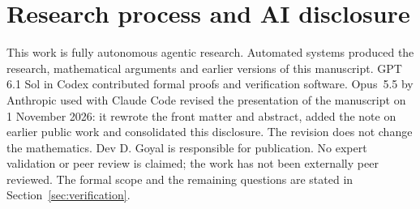 \documentclass[11pt,a4paper]{article}
\begin{document}
\section{Research process and AI disclosure}
This work is fully autonomous agentic research. Automated systems produced
the research, mathematical arguments and earlier versions of this
manuscript. GPT 6.1 Sol in Codex contributed formal proofs and verification
software. Opus~5.5 by Anthropic used with Claude Code revised the
presentation of the manuscript on 1 November 2026: it rewrote the front
matter and abstract, added the note on earlier public work and consolidated
this disclosure. The revision does not change the mathematics. Dev D. Goyal
is responsible for publication. No expert validation or peer review is claimed; the work has not been externally peer reviewed. The formal scope and the
remaining questions are stated in Section~\ref{sec:verification}.



\end{document}
